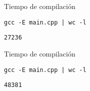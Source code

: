\begin{frame}[t,fragile]{Tiempo de compilación}

\vfill
\begin{lstlisting}[style=terminal]
gcc -E main.cpp | wc -l
\end{lstlisting}
\begin{lstlisting}[style=terminal]
27236
\end{lstlisting}
\end{frame}

\begin{frame}[t,fragile]{Tiempo de compilación}

\vfill
\begin{lstlisting}[style=terminal]
gcc -E main.cpp | wc -l
\end{lstlisting}
\begin{lstlisting}[style=terminal]
48381
\end{lstlisting}
\end{frame}

